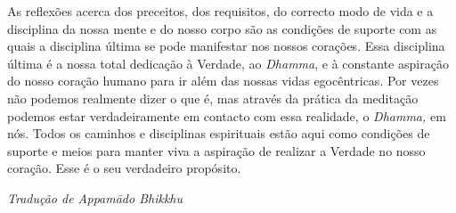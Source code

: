 As reflexões acerca dos preceitos, dos requisitos, do correcto modo de
vida e a disciplina da nossa mente e do nosso corpo são as condições de
suporte com as quais a disciplina última se pode manifestar nos nossos
corações. Essa disciplina última é a nossa total dedicação à Verdade, ao
\emph{Dhamma}, e à constante aspiração do nosso coração humano para ir
além das nossas vidas egocêntricas. Por vezes não podemos realmente
dizer o que é, mas através da prática da meditação podemos estar
verdadeiramente em contacto com essa realidade, o \emph{Dhamma,} em nós.
Todos os caminhos e disciplinas espirituais estão aqui como condições de
suporte e meios para manter viva a aspiração de realizar a Verdade no
nosso coração. Esse é o seu verdadeiro propósito.

\bigskip

{\raggedleft\itshape
  Tradução de Appamādo Bhikkhu
\par}